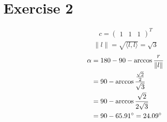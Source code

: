 \documentclass[tikz,14pt,fleqn]{article}
\begin{document}
\section{Exercise 2}
\begin{align*}
    c = \begin{pmatrix}
    1 & 1 & 1
    \end{pmatrix}^T
\end{align*}
\begin{align*}
    \|l\| = \sqrt{\langle l,l \rangle} = \sqrt{3}
\end{align*}
\begin{align*}
    \alpha &= 180 - 90 -\arccos{\frac{r}{\|l\|}} \\ 
    &= 90 -\arccos{\frac{\frac{\sqrt{2}}{2}}{\sqrt{3}}} \\
    &= 90 -\arccos{\frac{\sqrt{2}}{2\sqrt{3}}} \\
    &= 90 - 65.91\degree = 24.09\degree
\end{align*}
    
    

\clearpage
\end{document}
